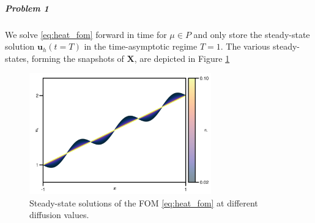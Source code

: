 \documentclass[../main.tex]{subfiles}
\begin{document}
\subparagraph{Problem 1}\label{subpar:problem1_fom}

We solve \eqref{eq:heat_fom} forward in time for $\mu\in P$ and only store the steady-state solution $\boldsymbol{u}_{h}(t=T)$ in the time-asymptotic regime $T=1$.
The various steady-states, forming the snapshots of $\boldsymbol{X}$, are depicted in Figure \ref{fig:problem1_fom}

\begin{figure}[H]
    \centering 
    \includegraphics[keepaspectratio, width=0.7\textwidth]{../figures/fig:problem1_fom.png}
    \caption{Steady-state solutions of the FOM \eqref{eq:heat_fom} at different diffusion values.}
    \label{fig:problem1_fom}
\end{figure}
\end{document}
